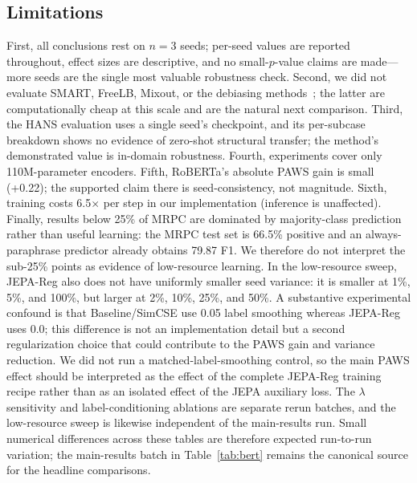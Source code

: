 \documentclass[sigconf]{acmart}
\begin{document}
\subsection{Limitations}
\label{sec:limitations}
First, all conclusions rest on $n=3$ seeds; per-seed values are reported throughout, effect sizes are descriptive, and no small-$p$-value claims are made---more seeds are the single most valuable robustness check. Second, we did not evaluate SMART, FreeLB, Mixout, or the debiasing methods~\cite{clark2019dont,utama2020towards}; the latter are computationally cheap at this scale and are the natural next comparison. Third, the HANS evaluation uses a single seed's checkpoint, and its per-subcase breakdown shows no evidence of zero-shot structural transfer; the method's demonstrated value is in-domain robustness. Fourth, experiments cover only 110M-parameter encoders. Fifth, RoBERTa's absolute PAWS gain is small (+0.22); the supported claim there is seed-consistency, not magnitude. Sixth, training costs 6.5$\times$ per step in our implementation (inference is unaffected). Finally, results below 25\% of MRPC are dominated by majority-class prediction rather than useful learning: the MRPC test set is 66.5\% positive and an always-paraphrase predictor already obtains 79.87 F1. We therefore do not interpret the sub-25\% points as evidence of low-resource learning. In the low-resource sweep, JEPA-Reg also does not have uniformly smaller seed variance: it is smaller at 1\%, 5\%, and 100\%, but larger at 2\%, 10\%, 25\%, and 50\%. A substantive experimental confound is that Baseline/SimCSE use 0.05 label smoothing whereas JEPA-Reg uses 0.0; this difference is not an implementation detail but a second regularization choice that could contribute to the PAWS gain and variance reduction. We did not run a matched-label-smoothing control, so the main PAWS effect should be interpreted as the effect of the complete JEPA-Reg training recipe rather than as an isolated effect of the JEPA auxiliary loss. The $\lambda$ sensitivity and label-conditioning ablations are separate rerun batches, and the low-resource sweep is likewise independent of the main-results run. Small numerical differences across these tables are therefore expected run-to-run variation; the main-results batch in Table~\ref{tab:bert} remains the canonical source for the headline comparisons.
\end{document}
